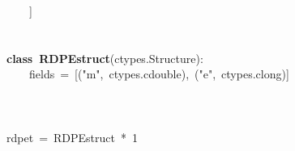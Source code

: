 \documentclass{article}\usepackage[]{graphicx}\usepackage[dvipsnames,table]{xcolor}
\makeatletter
\newcommand{\hlnum}[1]{\textcolor[rgb]{0.686,0.059,0.569}{#1}}%
\newcommand{\hlsng}[1]{\textcolor[rgb]{0.192,0.494,0.8}{#1}}%
\newcommand{\hlopt}[1]{\textcolor[rgb]{0,0,0}{#1}}%
\newcommand{\hldef}[1]{\textcolor[rgb]{0.345,0.345,0.345}{#1}}%
\newcommand{\hlkwa}[1]{\textcolor[rgb]{0.161,0.373,0.58}{\textbf{#1}}}%
\newcommand{\hlkwd}[1]{\textcolor[rgb]{0.737,0.353,0.396}{\textbf{#1}}}%
\newenvironment{kframe}{%
 \def\at@end@of@kframe{}%
 \ifinner\ifhmode%
  \def\at@end@of@kframe{\end{minipage}}%
  \begin{minipage}{\columnwidth}%
 \fi\fi%
 \def\FrameCommand##1{\hskip\@totalleftmargin \hskip-\fboxsep
 \colorbox{shadecolor}{##1}\hskip-\fboxsep
     \hskip-\linewidth \hskip-\@totalleftmargin \hskip\columnwidth}%
 \MakeFramed {\advance\hsize-\width
   \@totalleftmargin\z@ \linewidth\hsize
   \@setminipage}}%
 {\par\unskip\endMakeFramed%
 \at@end@of@kframe}
\newenvironment{knitrout}{}{} %
\makeatother
\begin{document}
\begin{center}
\begin{minipage}[m]{15cm}
\begin{knitrout}
\begin{kframe}
\hldef{}\hldef{\ \ \ \ }\hldef{}\hlopt{{]}}\hspace*{\fill}\\
\hldef{}\hspace*{\fill}\\
\hldef{}\hspace*{\fill}\\
\hldef{}\hlkwa{class\ }\hldef{}\hlkwd{RDPE\textunderscore struct}\hldef{}\hlopt{(}\hldef{ctypes}\hlopt{.}\hldef{Structure}\hlopt{):}\hspace*{\fill}\\
\hldef{}\hldef{\ \ \ \ }\hldef{\textunderscore fields\textunderscore \ }\hlopt{=\ {[}(}\hldef{}\hlsng{"m"}\hldef{}\hlopt{,\ }\hldef{ctypes}\hlopt{.}\hldef{c\textunderscore double}\hlopt{),\ (}\hldef{}\hlsng{"e"}\hldef{}\hlopt{,\ }\hldef{ctypes}\hlopt{.}\hldef{c\textunderscore long}\hlopt{){]}}\hspace*{\fill}\\
\hldef{}\hspace*{\fill}\\
\hldef{}\hspace*{\fill}\\
\hldef{}\hspace*{\fill}\\
\hldef{rdpe\textunderscore t\ }\hlopt{=\ }\hldef{RDPE\textunderscore struct\ }\hlopt{{*}\ }\hldef{}\hlnum{1}\hldef{}\hspace*{\fill}
\mbox{}
\normalfont
\end{kframe}
\end{knitrout}
\end{minipage}
\end{center}

\newpage
\end{document}

